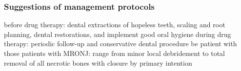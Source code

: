 \documentclass[
paper=landscape,
paper=160mm:90mm, %
fontsize=11pt, %
pagesize, %
parskip=half-, %
]{scrartcl} %
\theoremstyle{mythmstyle} %
\begin{document}
\clearpage



\subsubsection{Suggestions of management protocols}

\begin{outline}
    \1 before drug therapy: dental extractions of hopeless teeth, scaling and root planning, dental restorations, and implement good oral hygiene
    \1 during drug therapy: periodic follow-up and conservative dental procedure
    \1 be patient with those patients with MRONJ: range from minor local debridement to total removal of all necrotic bones with closure by primary intention

\end{outline}

\end{document}
